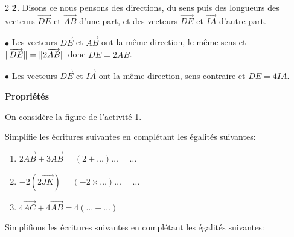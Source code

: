 \begin{multicols*}{2}
  	\textbf{2.} Disons ce nous pensons des directions, du sens puis des longueurs des 
  	vecteurs $\overrightarrow{DE}$ et  $ \overrightarrow{AB}$  d’une part, et des vecteurs $\overrightarrow{DE}$ et $ \overrightarrow{IA}$ d’autre 
  	part.
  	
  	$\bullet$ Les vecteurs $\overrightarrow{DE}$ et  $\overrightarrow{AB}$ ont la même direction, le même sens et $\|\overrightarrow{DE}\Arrowvert =\Arrowvert 2\overrightarrow{AB} \Arrowvert $ donc $DE=2AB$. 
  	
  	$\bullet$ Les vecteurs $\overrightarrow{DE}$ et  $\overrightarrow{IA}$ ont la même direction, sens contraire  et $DE=4IA$.
  	
  	
  	 \textbf{Propriétés }
  	
  	On considère la figure de l'activité 1.
  	
  	Simplifie les écritures suivantes en complétant les égalités suivantes:
  	\begin{enumerate}
  		\item $2\overrightarrow{AB}+ 3\overrightarrow{AB}=(2+\dots)\dots=\dots$	
  		\item $-2\left(2\overrightarrow{JK}\right)=(-2 \times \dots)\dots=\dots$
  		\item $4\overrightarrow{AC}+ 4\overrightarrow{AB}=4\left(\dots+\dots\right)$
  	\end{enumerate}
  	\dure
  	\resul
  	Simplifions les écritures suivantes en complétant les égalités suivantes:
  	

\end{multicols*}
